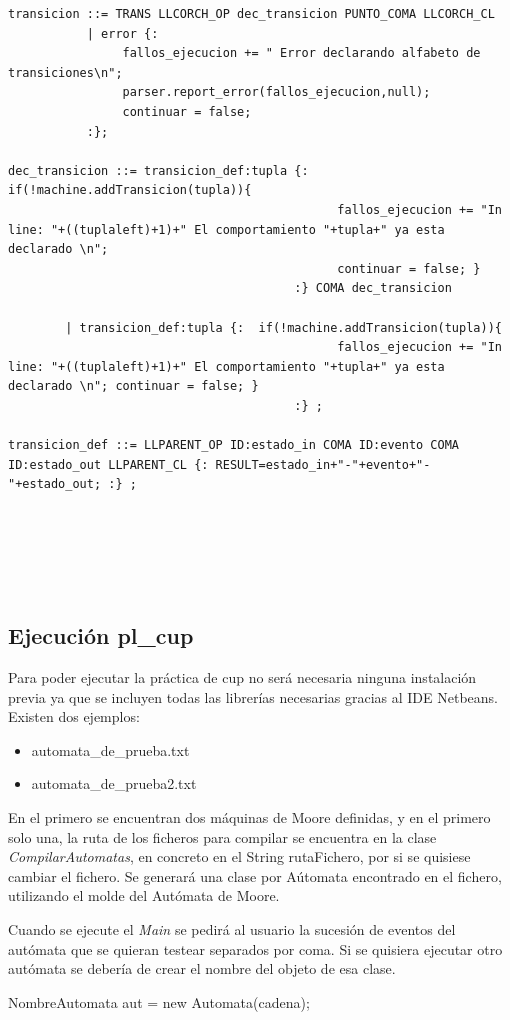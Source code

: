 \documentclass[12pt,a4paper]{article}
\begin{document}
\begin{lstlisting}[caption=Analizador Sintáctico y Semántico en CUP]
transicion ::= TRANS LLCORCH_OP dec_transicion PUNTO_COMA LLCORCH_CL 
		   | error {:
				fallos_ejecucion += " Error declarando alfabeto de transiciones\n";
				parser.report_error(fallos_ejecucion,null);
				continuar = false;
		   :};

dec_transicion ::= transicion_def:tupla {:  if(!machine.addTransicion(tupla)){
                                              fallos_ejecucion += "In line: "+((tuplaleft)+1)+" El comportamiento "+tupla+" ya esta declarado \n"; 
                                              continuar = false; }
                                        :} COMA dec_transicion 

		| transicion_def:tupla {:  if(!machine.addTransicion(tupla)){
                                              fallos_ejecucion += "In line: "+((tuplaleft)+1)+" El comportamiento "+tupla+" ya esta declarado \n"; continuar = false; }
                                        :} ;

transicion_def ::= LLPARENT_OP ID:estado_in COMA ID:evento COMA ID:estado_out LLPARENT_CL {: RESULT=estado_in+"-"+evento+"-"+estado_out; :} ;
	





\end{lstlisting}
\subsection{Ejecución pl\_cup}
Para poder ejecutar la práctica de cup no será necesaria ninguna instalación previa ya que se incluyen todas las librerías necesarias gracias al IDE Netbeans. Existen dos ejemplos:
\begin{itemize}
	\item automata\_de\_prueba.txt
	\item automata\_de\_prueba2.txt
\end{itemize}

En el primero se encuentran dos máquinas de Moore definidas, y en el primero solo una, la ruta de los ficheros para compilar se encuentra en la clase \textit{CompilarAutomatas}, en concreto en el String rutaFichero, por si se quisiese cambiar el fichero. Se generará una clase por Aútomata encontrado en el fichero, utilizando el molde del Autómata de Moore.\newline

Cuando se ejecute el \textit{Main} se pedirá al usuario la sucesión de eventos del autómata que se quieran testear separados por coma. Si se quisiera ejecutar otro autómata se debería de crear el nombre del objeto de esa clase.
\begin{center}
	NombreAutomata aut = new Automata(cadena); 
\end{center}
\end{document}
